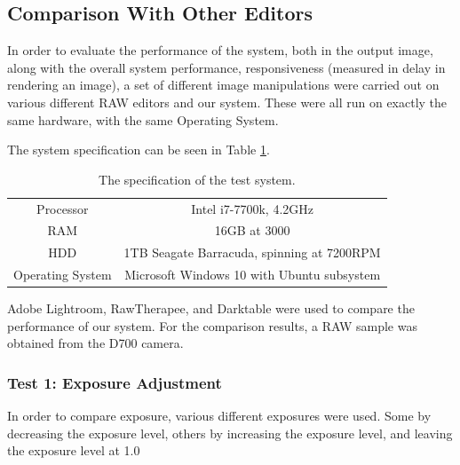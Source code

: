 \documentclass[10pt,a4paper]{article}
\begin{document}


\subsection{Comparison With Other Editors}
In order to evaluate the performance of the system, both in the output image, along with the overall system performance,
responsiveness (measured in delay in rendering an image), a set of different image manipulations were carried out on various
different RAW editors and our system. These were all run on exactly the same hardware, with the same Operating System.

The system specification can be seen in Table \ref{SystemSpecs}.

\begin{table}
    \centering
    \begin{tabular}{| c | c |}
        \hline
        Processor & Intel i7-7700k, 4.2GHz\\
        RAM & 16GB at 3000\\
        HDD & 1TB Seagate Barracuda, spinning at 7200RPM\\
        Operating System & Microsoft Windows 10 with Ubuntu subsystem\\
        \hline
    \end{tabular}
    \caption{The specification of the test system.}
    \label{SystemSpecs}
\end{table}

Adobe Lightroom, RawTherapee, and Darktable were used to compare the performance of our system. For the comparison results,
a RAW sample was obtained from the D700 camera.

\subsubsection{Test 1: Exposure Adjustment}
In order to compare exposure, various different exposures were used. Some by decreasing the exposure level, others by
increasing the exposure level, and leaving the exposure level at 1.0
\end{document}
